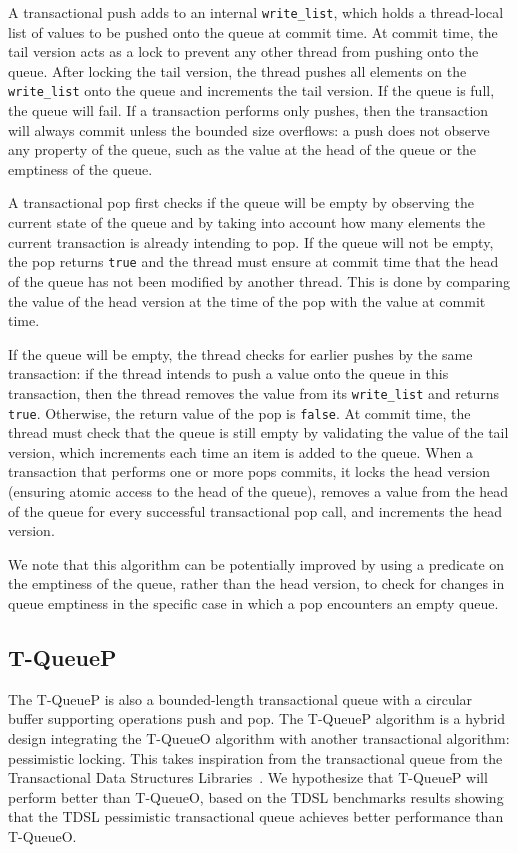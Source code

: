 A transactional push adds to an internal \texttt{write\_list}, which holds a thread-local list of values to be pushed onto the queue at commit time. At commit time, the tail version acts as a lock to prevent any other thread from pushing onto the queue. After locking the tail version, the thread pushes all elements on the \texttt{write\_list} onto the queue and increments the tail version. If the queue is full, the queue will fail.
If a transaction performs only pushes, then the transaction will always commit unless the bounded size overflows: a push does not observe any property of the queue, such as the value at the head of the queue or the emptiness of the queue. 

A transactional pop first checks if the queue will be empty by observing the current state of the queue and by taking into account how many elements the current transaction is already intending to pop. If the queue will not be empty, the pop returns \texttt{true} and the thread must ensure at commit time that the head of the queue has not been modified by another thread. This is done by comparing the value of the head version at the time of the pop with the value at commit time. 

If the queue will be empty, the thread checks for earlier pushes by the same transaction: if the thread intends to push a value onto the queue in this transaction, then the thread removes the value from its \texttt{write\_list} and returns \texttt{true}. Otherwise, the return value of the pop is \texttt{false}. At commit time, the thread must check that the queue is still empty by validating the value of the tail version, which increments each time an item is added to the queue.
When a transaction that performs one or more pops commits, it locks the head version (ensuring atomic access to the head of the queue), removes a value from the head of the queue for every successful transactional pop call, and increments the head version.

We note that this algorithm can be potentially improved by using a predicate on the emptiness of the queue, rather than the head version, to check for changes in queue emptiness in the specific case in which a pop encounters an empty queue.


\subsection{T-QueueP}
The T-QueueP is also a bounded-length transactional queue with a circular buffer supporting operations push and pop. The T-QueueP algorithm is a hybrid design integrating the T-QueueO algorithm with another transactional algorithm: pessimistic locking. This takes inspiration from the transactional queue from the Transactional Data Structures Libraries~\cite{tdsl}. We hypothesize that T-QueueP will perform better than T-QueueO, based on the TDSL benchmarks results showing that the TDSL pessimistic transactional queue achieves better performance than T-QueueO. 

